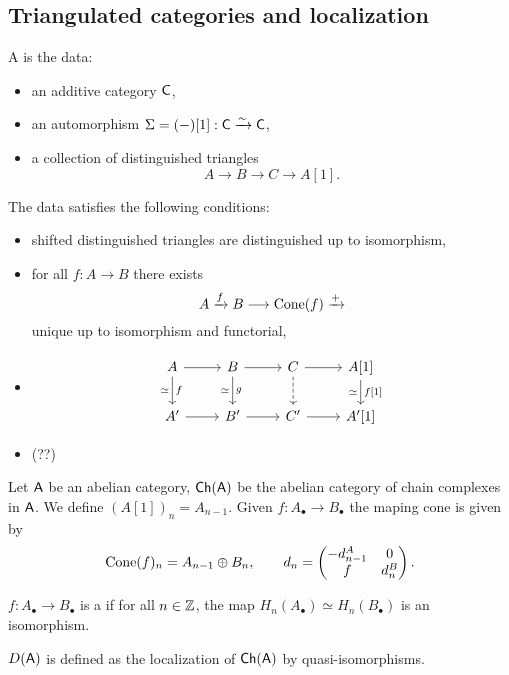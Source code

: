 \subsection{Triangulated categories and localization}
\begin{definition}
A  is the data:
\begin{itemize}
\item an additive category $\mathsf{C}$,
\item an automorphism $\Sigma=(-)[1]:\mathsf{C}\xrightarrow{\sim} \mathsf{C}$,
\item a collection of distinguished triangles
	\[
		A \to B \to C \to A[1]
	.\]
\end{itemize}
The data satisfies the following conditions:
\begin{itemize}
\item shifted distinguished triangles are distinguished up to isomorphism,
\item for all $f:A\to B$ there exists
	\[
		A \xrightarrow{f} B \to \Cone(f) \xrightarrow{+}
	\]
	unique up to isomorphism and functorial,
\item
	\begin{equation*}
		\begin{tikzcd}
			A \ar[r] \ar[d,"f","\simeq"'] & B \ar[r] \ar[d,"g","\simeq"'] & C \ar[d,dashed] \ar[r]
			& A[1] \ar[d,"{f[1]}","\simeq"'] \\
			A' \ar[r] & B' \ar[r] & C' \ar[r] & A'[1]
		\end{tikzcd}
	\end{equation*}	
\item (??)
\end{itemize}
\end{definition}

\begin{example}
Let $\mathsf{A}$ be an abelian category, $\mathsf{Ch}(\mathsf{A})$ be the abelian category of chain complexes in
$\mathsf{A}$. We define $(A[1])_n = A_{n-1}$. Given $f:A_\bullet\to B_\bullet$ the maping cone is given by
\[
\operatorname{Cone}(f)_n = A_{n-1} \oplus B_n,\qquad d_n =
\begin{pmatrix} -d_{n-1}^{A} & 0 \\ f & d_n^{B}
\end{pmatrix}
.\]
\end{example}
\begin{definition}
$f:A_\bullet\to B_\bullet$ is a  if for all $n\in \mathbb Z$, the map
$H_n(A_\bullet)\simeq H_n(B_\bullet)$ is an isomorphism.
\end{definition}
\begin{definition}
$D(\mathsf{A})$ is defined as the localization of $\mathsf{Ch}(\mathsf{A})$ by quasi-isomorphisms.
\end{definition}

